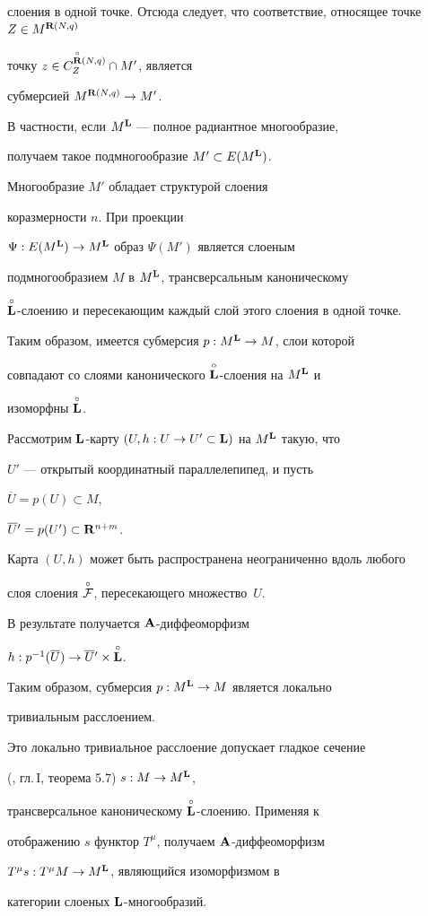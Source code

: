 \begin{pf}
слоения в одной точке. Отсюда следует, что соответствие, относящее точке $Z\in


M^{\R(N,q)}$


точку $z\in C^{\overset{\circ}{{\bold R}}{}(N,q)}_Z\cap M'$, является


субмерсией $M^{{\bold R}(N,q)}\to M'$.


В частности, если $M^{\bold L}$ --- полное радиантное многообразие,


получаем такое подмногообразие $M'\subset E(M^{\bold L})$.


Многообразие $M'$ обладает структурой слоения


коразмерности $n$. При проекции


$\Psi:E(M^{\bold L})\to M^{\bold L}$ образ $\Psi(M')$ является слоеным


подмногообразием $M$ в $M^{\bold L}$, трансверсальным каноническому


$\overset{\circ}{\bold L}{}$-слоению и пересекающим каждый слой этого слоения в одной точке.


Таким образом, имеется субмерсия $p: M^{\bold L}\to M$, слои которой


совпадают со слоями канонического $\overset{\circ}{\bold L}{}$-слоения на $M^{\bold L}$ и


изоморфны $\overset{\circ}{\bold L}{}$.


Рассмотрим ${\bold L}$-карту $(U,h:U\to U'\subset{\bold L})$ на $M^{\bold L}$ такую, что


$U'$ --- открытый координатный параллелепипед, и пусть


${\overline U}=p(U)\subset M$,


${\overline U}{}'=p(U')\subset{{\bold R}}^{n+m}$.


Карта $(U,h)$ может быть распространена неограниченно вдоль любого


слоя слоения $\overset{\circ}{\cal F}{}$, пересекающего множество~$U$.


В результате получается ${\bold A}$-диффеоморфизм


$h:p^{-1}({\overline U})\to {\overline U}{}'\times\overset{\circ}{\bold L}{}$.


Таким образом, субмерсия $p:M^{\bold L}\to M$ является локально


тривиальным расслоением.


Это локально тривиальное расслоение допускает гладкое сечение


(\cite{KN}, гл.\,I, теорема 5.7) $s:M\to M^{\bold L}$,


трансверсальное каноническому $\overset{\circ}{\bold L}{}$-слоению. Применяя к


отображению $s$ функтор $T^\mu$, получаем ${\bold A}$-диффеоморфизм


$T^{\mu}s:T^\mu M \to M^{\bold L}$, являющийся изоморфизмом в


категории слоеных ${\bold L}$-многообразий.


\end{pf}








